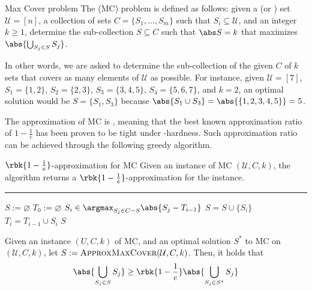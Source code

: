 \documentclass[a4paper, 12pt]{report}
\begin{document}
    \begin{frameddefn}{Max Cover problem}
        The  (MC) problem is defined as follows: given a  (or ) set $\mathcal U = [n]$, a collection of sets $C = \{S_1, \ldots, S_m \}$ such that $S_i \subseteq \mathcal U$, and an integer $k \ge 1$, determine the sub-collection $S \subseteq C$ such that $\abs S = k$ that maximizes $\abs{\bigcup_{S_j \in S}{S_j}}$.
    \end{frameddefn}

    In other words, we are asked to determine the sub-collection of the given $C$ of $k$ sets that covers as many elements of $\mathcal U$ as possible. For instance, given $\mathcal U = [7]$, $S_1 = \{1, 2\}$, $S_2 = \{2, 3\}$, $S_3 = \{3, 4, 5\}$, $S_4 = \{5, 6, 7\}$, and $k = 2$, an optimal solution would be $S = \{S_1, S_3\}$ because $\abs{S_1 \cup S_3} = \abs{\{1, 2, 3, 4, 5\}} = 5$.

    The approximation of MC is , meaning that the best known approximation ratio of $1 - \tfrac{1}{e}$ has been proven to be tight under \NPclass-hardness. Such approximation ratio can be achieved through the following greedy algorithm.

    \begin{framedalgo}{$\rbk{1 - \frac{1}{e}}$-approximation for MC}
        Given an instance of MC $(\mathcal U, C, k)$, the algorithm returns a $\rbk{1 - \tfrac{1}{e}}$-approximation for the instance. \\
        \hrule

        \quad
        \begin{algorithmic}[1]
                \State $S := \varnothing$
                \State $T_0 := \varnothing$
                    \State $\displaystyle S_i \in \argmax_{S_j \in C - S}{\abs{S_j - T_{i - 1}}}$ 
                    \State $S = S \cup \{S_i\}$
                    \State $T_i = T_{i - 1} \cup S_i$
                \EndFor
                \State {} $S$
            \EndFunction
        \end{algorithmic}
    \end{framedalgo}

    \begin{framedthm}[label={mc approx ratio}]{}
        Given an instance $(U, C, k)$ of MC, and an optimal solution $S^*$ to MC on $(\mathcal U, C, k)$, let $S := \textsc{ApproxMaxCover}(\mathcal U, C, k)$. Then, it holds that $$\abs{\bigcup_{S_j \in S}{S_j}} \ge \rbk{1 - \dfrac{1}{e}}\abs{\bigcup_{S_j \in S^*}{S_j}}$$
    \end{framedthm}
\end{document}
